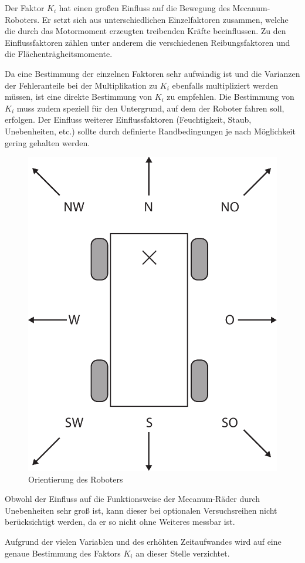 Der Faktor $K_i$ hat einen großen Einfluss auf die Bewegung des Mecanum-Roboters. Er setzt sich aus unterschiedlichen Einzelfaktoren zusammen, welche die durch das Motormoment erzeugten treibenden Kräfte beeinflussen. Zu den Einflussfaktoren zählen unter anderem die verschiedenen Reibungsfaktoren und die Flächenträgheitsmomente. 

Da eine Bestimmung der einzelnen Faktoren sehr aufwändig ist und die Varianzen der Fehleranteile  bei der Multiplikation zu $K_i$ ebenfalls multipliziert werden müssen, ist eine direkte Bestimmung von $K_i$ zu empfehlen.
Die Bestimmung von $K_i$ muss zudem speziell für den Untergrund, auf dem der Roboter fahren soll, erfolgen. Der Einfluss weiterer Einflussfaktoren (Feuchtigkeit, Staub, Unebenheiten, etc.) sollte durch definierte Randbedingungen je nach Möglichkeit gering gehalten werden. 

\begin{figure}[H]
    \centering
    \includegraphics[width=.4\textwidth]{Abbildungen/Himmelsrichtungen}
    \caption{Orientierung des Roboters}
    \label{fig:himmel}
  \end {figure}

Obwohl der Einfluss auf die Funktionsweise der Mecanum-Räder durch Unebenheiten sehr groß ist, kann dieser bei optionalen Versuchsreihen nicht berücksichtigt werden, da er so nicht ohne Weiteres messbar ist.

Aufgrund der vielen Variablen und des erhöhten Zeitaufwandes wird auf eine genaue Bestimmung des Faktors $K_i$ an dieser Stelle verzichtet. 












